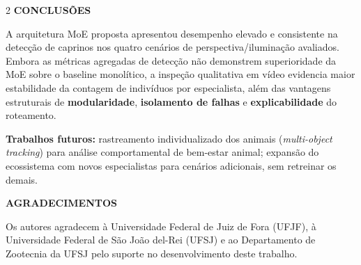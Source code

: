 \documentclass[a0,portrait]{a0poster}
\newcommand{\sectionfont}{\fontsize{34}{46}\selectfont\bfseries}
\newcommand{\bodyfont}{\fontsize{25}{31}\selectfont}
\begin{document}
\begin{multicols}{2}
{\sectionfont CONCLUSÕES}

{\bodyfont
A arquitetura MoE proposta apresentou desempenho elevado e consistente na detecção de caprinos nos quatro cenários de perspectiva/iluminação avaliados. Embora as métricas agregadas de detecção não demonstrem superioridade da MoE sobre o baseline monolítico, a inspeção qualitativa em vídeo evidencia maior estabilidade da contagem de indivíduos por especialista, além das vantagens estruturais de \textbf{modularidade}, \textbf{isolamento de falhas} e \textbf{explicabilidade} do roteamento.

\textbf{Trabalhos futuros:} rastreamento individualizado dos animais (\textit{multi-object tracking}) para análise comportamental de bem-estar animal; expansão do ecossistema com novos especialistas para cenários adicionais, sem retreinar os demais.
}

\vspace{1cm}

{\sectionfont AGRADECIMENTOS}

{\bodyfont
Os autores agradecem à Universidade Federal de Juiz de Fora (UFJF), à Universidade Federal de São João del-Rei (UFSJ) e ao Departamento de Zootecnia da UFSJ pelo suporte no desenvolvimento deste trabalho.
}

\vfill

\end{multicols}
\end{document}
